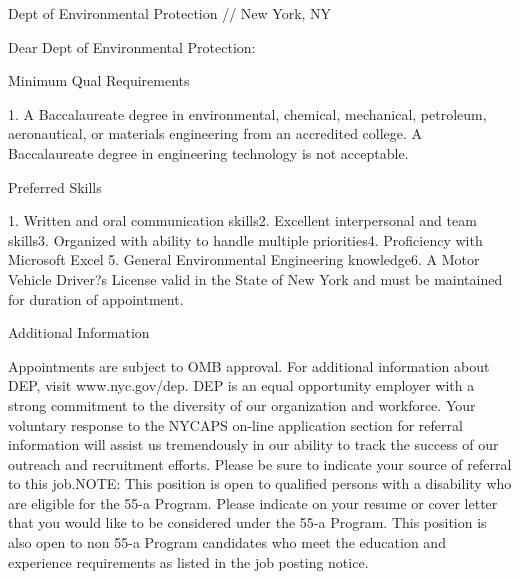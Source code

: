 \documentclass[
    jphafner,
    fontsize=11pt,
    foldmarks=false,
    pagenumber=false,
    addrfield=true,
]{scrlttr2}
\date{\today}
\begin{document}
\begin{letter}{Dept of Environmental Protection // New  York, NY} %
\opening{Dear Dept of Environmental Protection:}


Minimum Qual Requirements

1. A Baccalaureate degree in environmental, chemical, mechanical, petroleum, aeronautical, or materials engineering from an accredited college. A Baccalaureate degree in engineering technology is not acceptable.

Preferred Skills

1. Written and oral communication skills2. Excellent interpersonal and team skills3. Organized with ability to handle multiple priorities4. Proficiency with Microsoft Excel 5. General Environmental Engineering knowledge6. A Motor Vehicle Driver?s License valid in the State of New York and must be maintained for duration of appointment.

Additional Information

Appointments are subject to OMB approval. For additional information about DEP, visit www.nyc.gov/dep. DEP is an equal opportunity employer with a strong commitment to the diversity of our organization and workforce. Your voluntary response to the NYCAPS on-line application section for referral information will assist us tremendously in our ability to track the success of our outreach and recruitment efforts. Please be sure to indicate your source of referral to this job.NOTE: This position is open to qualified persons with a disability who are eligible for the 55-a Program. Please indicate on your resume or cover letter that you would like to be considered under the 55-a Program. This position is also open to non 55-a Program candidates who meet the education and experience requirements as listed in the job posting notice.






\end{letter}
\end{document}
